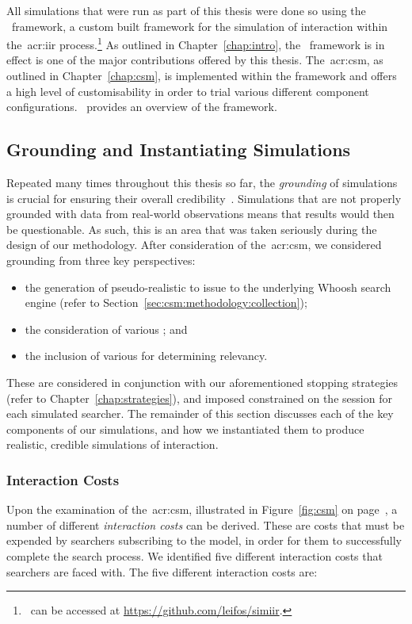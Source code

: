  All simulations that were run as part of this thesis were done so using the \simiir~framework, a custom built framework for the simulation of interaction within the~\gls{acr:iir} process.\footnote{\simiir~can be accessed at \url{https://github.com/leifos/simiir}. } As outlined in Chapter~\ref{chap:intro}, the \simiir~framework is in effect is one of the major contributions offered by this thesis. The~\gls{acr:csm}, as outlined in Chapter~\ref{chap:csm}, is implemented within the framework and offers a high level of customisability in order to trial various different component configurations.~\cite{maxwell2016simiir} provides an overview of the framework.

\subsection{Grounding and Instantiating Simulations}\label{chap:csm:method:simulation:grounding}
Repeated many times throughout this thesis so far, the \emph{grounding} of simulations is crucial for ensuring their overall credibility~\citep{azzopardi2010workshop}. Simulations that are not properly grounded with data from real-world observations means that results would then be questionable. As such, this is an area that was taken seriously during the design of our methodology. After consideration of the~\gls{acr:csm}, we considered grounding from three key perspectives:

\begin{itemize}
    \item{the generation of pseudo-realistic  to issue to the underlying Whoosh search engine (refer to Section~\ref{sec:csm:methodology:collection});}
    \item{the consideration of various ; and}
    \item{the inclusion of various  for determining relevancy.}
\end{itemize}

These are considered in conjunction with our aforementioned stopping strategies (refer to Chapter~\ref{chap:strategies}), and imposed constrained on the session for each simulated searcher. The remainder of this section discusses each of the key components of our simulations, and how we instantiated them to produce realistic, credible simulations of interaction.

\subsubsection{Interaction Costs}\label{chap:csm:method:simulation:grounding:costs}
Upon the examination of the~\gls{acr:csm}, illustrated in Figure~\ref{fig:csm} on page~\pageref{fig:csm}, a number of different \emph{interaction costs} can be derived. These are costs that must be expended by searchers subscribing to the model, in order for them to successfully complete the search process. We identified five different interaction costs that searchers are faced with. The five different interaction costs are:

